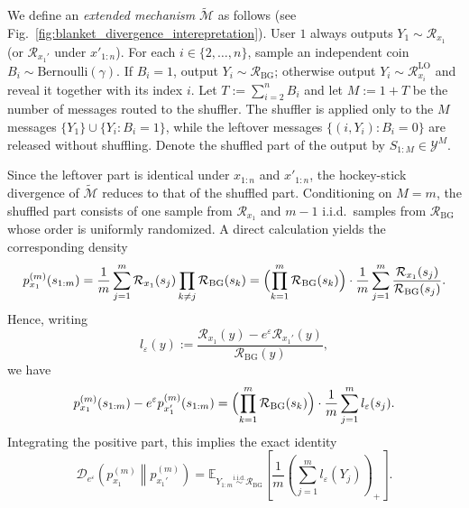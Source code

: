 \documentclass{article}
\theoremstyle{plain}
\theoremstyle{definition}
\begin{document}
We define an \emph{extended mechanism} $\widetilde{\mathcal M}$ as follows (see Fig.~\ref{fig:blanket_divergence_interepretation}).
User $1$ always outputs $Y_1\sim \mathcal R_{x_1}$ (or $\mathcal R_{x_1'}$ under $x'_{1:n}$). 
For each $i\in\{2,\dots,n\}$, sample an independent coin $B_i\sim \mathrm{Bernoulli}(\gamma)$.
If $B_i=1$, output $Y_i\sim \mathcal R_{\mathrm{BG}}$; otherwise output
$Y_i\sim \mathcal R^{\mathrm{LO}}_{x_i}$ and reveal it together with
its index $i$.
Let $T:=\sum_{i=2}^n B_i$ and let $M:=1+T$ be the number of messages routed
to the shuffler. The shuffler is applied only to the $M$ messages
$\{Y_1\}\cup\{Y_i:B_i=1\}$, while the leftover messages
$\{(i,Y_i):B_i=0\}$ are released without shuffling. Denote the shuffled
part of the output by $S_{1:M}\in\mathcal Y^M$.

Since the leftover part is identical under $x_{1:n}$ and $x'_{1:n}$, the
hockey-stick divergence of $\widetilde{\mathcal M}$ reduces to that of the
shuffled part. Conditioning on $M=m$, the shuffled part consists of one
sample from $\mathcal R_{x_1}$ and $m-1$ i.i.d.\ samples from
$\mathcal R_{\mathrm{BG}}$ whose order is uniformly randomized. A direct
calculation yields the corresponding density
\[
p_{x_1}^{(m)}(s_{1:m})
=
\frac{1}{m}\sum_{j=1}^m
\mathcal R_{x_1}(s_j)\prod_{k\ne j}\mathcal R_{\mathrm{BG}}(s_k)
=
\Bigl(\prod_{k=1}^m \mathcal R_{\mathrm{BG}}(s_k)\Bigr)\cdot
\frac{1}{m}\sum_{j=1}^m
\frac{\mathcal R_{x_1}(s_j)}{\mathcal R_{\mathrm{BG}}(s_j)}.
\]
Hence, writing
\[
l_\varepsilon(y)
:=
\frac{\mathcal R_{x_1}(y)-e^\varepsilon \mathcal R_{x_1'}(y)}
{\mathcal R_{\mathrm{BG}}(y)},
\]
we have
\[
p_{x_1}^{(m)}(s_{1:m})-e^\varepsilon p_{x_1'}^{(m)}(s_{1:m})
=
\Bigl(\prod_{k=1}^m \mathcal R_{\mathrm{BG}}(s_k)\Bigr)\cdot
\frac{1}{m}\sum_{j=1}^m l_\varepsilon(s_j).
\]
Integrating the positive part, this implies the exact identity
\[
\mathcal D_{e^\varepsilon}\!\left(p_{x_1}^{(m)}\middle\|p_{x_1'}^{(m)}\right)
=
\mathbb E_{Y_{1:m}\stackrel{\mathrm{i.i.d.}}{\sim}\mathcal R_{\mathrm{BG}}}
\left[
\frac{1}{m}\left(\sum_{j=1}^m l_\varepsilon(Y_j)\right)_+
\right].
\]
\end{document}
